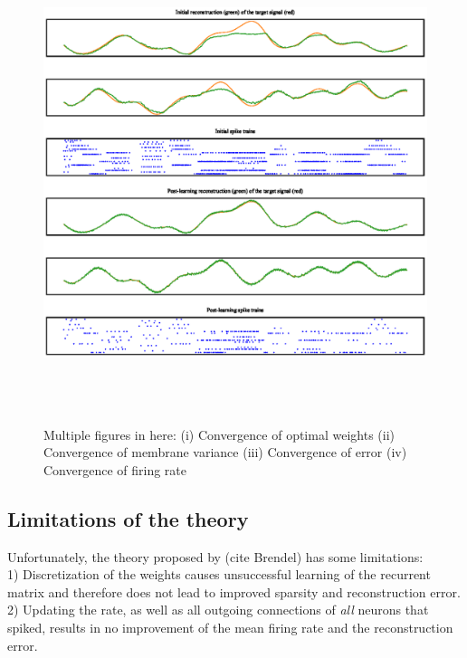 \documentclass[twoside,11pt]{article}
\begin{document}
\begin{figure}[!htb]
  \includegraphics[width = \columnwidth, height=14cm]{figures/reconstruction.eps}
  \caption{Multiple figures in here: (i) Convergence of optimal weights
  (ii) Convergence of membrane variance (iii) Convergence of error (iv) Convergence
  of firing rate}
  \label{fig:reconstruction}
\end{figure}
\newpage

\subsection{Limitations of the theory} \label{sec:limitations}
Unfortunately, the theory proposed by (cite Brendel) has some limitations: \\
1) Discretization of the weights causes unsuccessful learning of the recurrent matrix and therefore
does not lead to improved sparsity and reconstruction error. \\
2) Updating the rate, as well as all outgoing connections of \emph{all} neurons that spiked,
results in no improvement of the mean firing rate and the reconstruction error. \\
\end{document}
